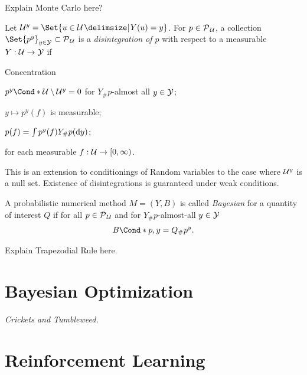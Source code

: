 Explain Monte Carlo here?

\begin{definition}[Disintegration]
    Let $\Uc^y = \Set{u \in \Uc \with Y(u) = y}$.
    For $p \in \operatorname{\mathcal{P}\mkern1mu}_{\mathcal{U}}$, a collection $\Set{p^y}_{y \in \Yc} \subset \Probs{\Uc}$ is a \emph{disintegration of $p$} with respect to a measurable $Y: \mathcal{U} \to \mathcal{Y}$ if
    \begin{labeling}{Concentration\quad}
        \item[Concentration] $\Fun*{p^y}{\Uc \setminus \Uc^y} = 0$ for $Y_\#p$-almost all $y \in \mathcal{Y}$;
        \item[Measurability] $y \mapsto p^y(f)$ is measurable;
        \item[Conditioning] $p(f) = \int p^y(f) Y_\#p(\mathop{}\!\mathrm{d} y)$;
    \end{labeling}
    for each measurable $f : \mathcal{U} \to [0, \infty)$.
\end{definition}
This is an extension to conditionings of Random variables to the case where $\mathcal{U}^y$ is a null set.
Existence of disintegrations is guaranteed under weak conditions.

\begin{definition}
    \label{def:bayesian_probabilistic_numerical_method}
    A probabilistic numerical method $M = (Y, B)$ is called \emph{Bayesian} for a quantity of interest $Q$ if for all $p \in \operatorname{\mathcal{P}\mkern1mu}_{\mathcal{U}}$ and for $Y_\#p$-almost-all $y \in \mathcal{Y}$
    \begin{align}
        \Fun*{B}{p, y} = Q_\#p^y.
    \end{align}
\end{definition}

Explain Trapezodial Rule here.


\section{Bayesian Optimization}
\label{sec:bayesian_optimization}
\emph{Crickets and Tumbleweed.}


\section{Reinforcement Learning}
\label{sec:reinforcement_learning}
\parencite{bertsekas_stochastic_1978}

